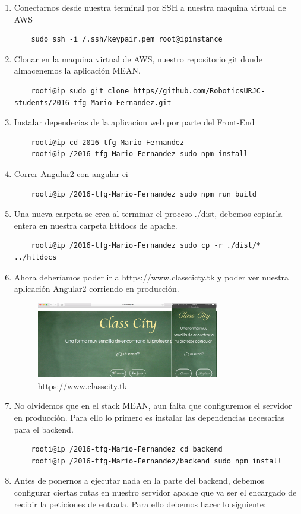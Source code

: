 \begin{enumerate}
    \item Conectarnos desde nuestra terminal por SSH a nuestra maquina virtual de AWS
    \begin{lstlisting}
    sudo ssh -i /.ssh/keypair.pem root@ipinstance
    \end{lstlisting}
    \item Clonar en la maquina virtual de AWS, nuestro repositorio git donde almacenemos la aplicación MEAN.
    \begin{lstlisting}
    rooti@ip sudo git clone https//github.com/RoboticsURJC-students/2016-tfg-Mario-Fernandez.git 
    \end{lstlisting}
    \item Instalar dependecias de la aplicacion web por parte del Front-End
    \begin{lstlisting}
    rooti@ip cd 2016-tfg-Mario-Fernandez
    rooti@ip /2016-tfg-Mario-Fernandez sudo npm install
    \end{lstlisting}
    \item Correr Angular2 con angular-ci
    \begin{lstlisting}
    rooti@ip /2016-tfg-Mario-Fernandez sudo npm run build
    \end{lstlisting}
    \item Una nueva carpeta se crea al terminar el proceso ./dist, debemos copiarla entera en nuestra carpeta httdocs de apache.
    \begin{lstlisting}
    rooti@ip /2016-tfg-Mario-Fernandez sudo cp -r ./dist/* ../httdocs
    \end{lstlisting}
    \item Ahora deberíamos poder ir a https://www.classcicty.tk y poder ver nuestra aplicación Angular2 corriendo en producción.
     \begin{figure}[H]
    \centering
    \includegraphics[width=80mm]{memoria/LaTeX/img/templates/intro.png}
    \caption{https://www.classcity.tk}
    \end{figure}
    \item No olvidemos que en el stack MEAN, aun falta que configuremos el servidor en producción. Para ello lo primero es instalar las dependencias necesarias para el backend.
    \begin{lstlisting}
    rooti@ip /2016-tfg-Mario-Fernandez cd backend
    rooti@ip /2016-tfg-Mario-Fernandez/backend sudo npm install
    \end{lstlisting}
    \item Antes de ponernos a ejecutar nada en la parte del backend, debemos configurar ciertas rutas en nuestro servidor apache que va ser el encargado de recibir la peticiones de entrada. Para ello debemos hacer lo siguiente:
    \begin{itemize}
    

\end{itemize}
\end{enumerate}
